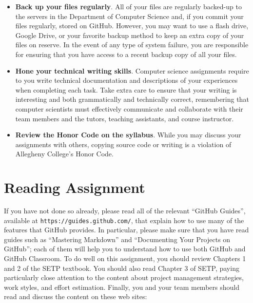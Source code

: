 \documentclass[11pt]{article}
\newcommand{\url}[1]{\lstinline{#1}}
\begin{document}
\begin{itemize}
\item {\bf Back up your files regularly}. All of your files are regularly backed-up to the servers in the Department of
  Computer Science and, if you commit your files regularly, stored on GitHub. However, you may want to use a flash
  drive, Google Drive, or your favorite backup method to keep an extra copy of your files on reserve. In the event of
  any type of system failure, you are responsible for ensuring that you have access to a recent backup copy of all your
  files.

\item {\bf Hone your technical writing skills}. Computer science assignments require to you write technical
  documentation and descriptions of your experiences when completing each task. Take extra care to ensure that your
  writing is interesting and both grammatically and technically correct, remembering that computer scientists must
  effectively communicate and collaborate with their team members and the tutors, teaching assistants, and course
  instructor.

\item {\bf Review the Honor Code on the syllabus}. While you may discuss your assignments with others, copying source
  code or writing is a violation of Allegheny College's Honor Code.

\end{itemize}

\section*{Reading Assignment}

If you have not done so already, please read all of the relevant ``GitHub Guides'', available at
\url{https://guides.github.com/}, that explain how to use many of the features that GitHub provides. In particular,
please make sure that you have read guides such as ``Mastering Markdown'' and ``Documenting Your Projects on GitHub'';
each of them will help you to understand how to use both GitHub and GitHub Classroom. To do well on this assignment, you
should review Chapters 1 and 2 of the SETP textbook. You should also read Chapter 3 of SETP, paying particularly close
attention to the content about project management strategies, work styles, and effort estimation. Finally, you and your
team members should read and discuss the content on these web sites:

\vspace*{-.5em}
\end{document}
